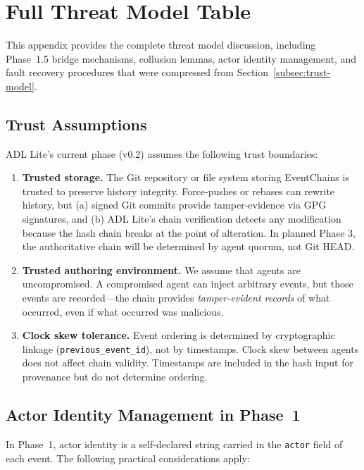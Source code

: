\section{Full Threat Model Table}\label{app:threat-model}

This appendix provides the complete threat model discussion, including Phase~1.5 bridge mechanisms, collusion lemmas, actor identity management, and fault recovery procedures that were compressed from Section~\ref{subsec:trust-model}.

\subsection{Trust Assumptions}

ADL Lite's current phase (v0.2) assumes the following trust boundaries:

\begin{enumerate}[label=(\arabic*)]
    \item \textbf{Trusted storage.} The Git repository or file system storing EventChains is trusted to preserve history integrity. Force-pushes or rebases can rewrite history, but (a) signed Git commits provide tamper-evidence via GPG signatures, and (b) ADL Lite's chain verification detects any modification because the hash chain breaks at the point of alteration. In planned Phase 3, the authoritative chain will be determined by agent quorum, not Git HEAD.
    \item \textbf{Trusted authoring environment.} We assume that agents are uncompromised. A compromised agent can inject arbitrary events, but those events are recorded---the chain provides \emph{tamper-evident records} of what occurred, even if what occurred was malicious.
    \item \textbf{Clock skew tolerance.} Event ordering is determined by cryptographic linkage (\texttt{previous\_event\_id}), not by timestamps. Clock skew between agents does not affect chain validity. Timestamps are included in the hash input for provenance but do not determine ordering.
\end{enumerate}

\subsection{Actor Identity Management in Phase~1}

In Phase~1, actor identity is a self-declared string carried in the \texttt{actor} field of each event. The following practical considerations apply:

